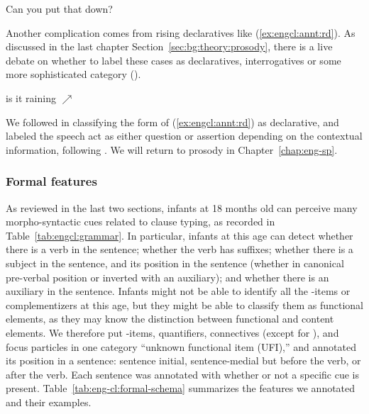 Can you put that down?
\eex 

Another complication comes from rising declaratives like (\ref{ex:engcl:annt:rd}). As discussed in the last chapter Section~\ref{sec:bg:theory:prosody}, there is a live debate on whether to label these cases as declaratives, interrogatives or some more sophisticated category (\cite{gunlogson2008,  farkasroelofsen2017}). 

is it raining $\nearrow$
\eex

We followed \textcite{gunlogson2008} in classifying the form of (\ref{ex:engcl:annt:rd}) as declarative, and labeled the speech act as either question or assertion depending on the contextual information, following \textcite{jeong2018, goodhue2021rd}. We will return to prosody in Chapter~\ref{chap:eng-sp}.

\subsubsection{Formal features}

As reviewed in the last two sections, infants at 18 months old can perceive many morpho-syntactic cues related to clause typing, as recorded in Table~\ref{tab:engcl:grammar}. In particular, infants at this age can detect whether there is a verb in the sentence; whether the verb has suffixes; whether there is a subject in the sentence, and its position in the sentence (whether in canonical pre-verbal position or inverted with an auxiliary); and whether there is an auxiliary in the sentence. Infants might not be able to identify all the \twh-items or complementizers at this age, but they might be able to classify them as functional elements, as they may know the distinction between functional and content elements. We therefore put \twh-items, quantifiers, connectives (except for ), and focus particles in one category ``unknown functional item (UFI),'' and annotated its position in a sentence: sentence initial, sentence-medial but before the verb, or after the verb. Each sentence was annotated with whether or not a specific cue is present. Table~\ref{tab:eng-cl:formal-schema} summarizes the features we annotated and their examples.  


